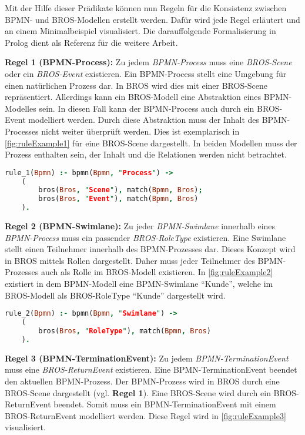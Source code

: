 Mit der Hilfe dieser Prädikate können nun Regeln für die Konsistenz zwischen BPMN- und BROS-Modellen erstellt werden.
Dafür wird jede Regel erläutert und an einem Minimalbeispiel visualisiert.
Die darauffolgende Formalisierung in Prolog dient als Referenz für die weitere Arbeit.



\textbf{Regel 1 (BPMN-Process):} 
Zu jedem \emph{BPMN-Process} muss eine \emph{BROS-Scene} oder ein \emph{BROS-Event} existieren.
Ein BPMN-Process stellt eine Umgebung für einen natürlichen Prozess dar.
In BROS wird dies mit einer BROS-Scene repräsentiert.
Allerdings kann ein BROS-Modell eine Abstraktion eines BPMN-Modelles sein.
In diesen Fall kann der BPMN-Process auch durch ein BROS-Event modelliert werden.
Durch diese Abstraktion muss der Inhalt des BPMN-Processes nicht weiter überprüft werden.
Dies ist exemplarisch in \cref{fig:ruleExample1} für eine BROS-Scene dargestellt.
In beiden Modellen muss der Prozess enthalten sein, der Inhalt und die Relationen werden nicht betrachtet.

\begin{lstlisting}[language=Prolog, caption=Formalisierung der Regel 1, label=lst:rule_1]
rule_1(Bpmn) :- bpmn(Bpmn, "Process") ->
    (
        bros(Bros, "Scene"), match(Bpmn, Bros);
        bros(Bros, "Event"), match(Bpmn, Bros)
    ).
\end{lstlisting}

\textbf{Regel 2 (BPMN-Swimlane):}
Zu jeder \emph{BPMN-Swimlane} innerhalb eines \emph{BPMN-Process} muss ein passender \emph{BROS-RoleType} existieren.
Eine Swimlane stellt einen Teilnehmer innerhalb des BPMN-Prozesses dar. 
Dieses Konzept wird in BROS mittels Rollen dargestellt.
Daher muss jeder Teilnehmer des BPMN-Prozesses auch als Rolle im BROS-Modell existieren.
In \cref{fig:ruleExample2} existiert in dem BPMN-Modell eine BPMN-Swimlane ``Kunde'', welche im BROS-Modell als BROS-RoleType ``Kunde'' dargestellt wird.

\begin{lstlisting}[language=Prolog, caption=Formalisierung der Regel 2, label=lst:rule_2]
rule_2(Bpmn) :- bpmn(Bpmn, "Swimlane") ->
    (
        bros(Bros, "RoleType"), match(Bpmn, Bros)
    ).
\end{lstlisting}

\textbf{Regel 3 (BPMN-TerminationEvent):}
Zu jedem \emph{BPMN-TerminationEvent} muss eine \emph{BROS-ReturnEvent} existieren.
Eine BPMN-TerminationEvent beendet den aktuellen BPMN-Prozess.
Der BPMN-Prozess wird in BROS durch eine BROS-Scene dargestellt (vgl. \textbf{Regel 1}).
Eine BROS-Scene wird durch ein BROS-ReturnEvent beendet.
Somit muss ein BPMN-TerminationEvent mit einem BROS-ReturnEvent modelliert werden.
Diese Regel wird in \cref{fig:ruleExample3} visualisiert.


